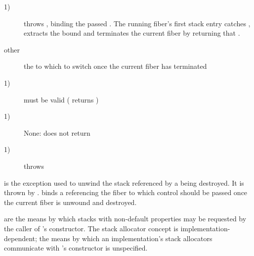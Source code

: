 \begin{description}
    \item[1)] throws \unwindex, binding the passed \fiber. The running fiber's
              first stack entry catches \unwindex, extracts the bound \fiber
              and terminates the current fiber by returning that \fiber.
\end{description}

\begin{description}
    \item[other] the \fiber to which to switch once the current fiber has terminated
\end{description}

\begin{description}
    \item[1)]  must be valid ( returns )
\end{description}

\begin{description}
    \item[1)] None: \unwindfib does not return
\end{description}

\begin{description}
    \item[1)] throws \unwindex
\end{description}



is the exception used to unwind the stack referenced by a \fiber being destroyed.
It is thrown by \unwindfib. \unwindex binds a \fiber referencing the fiber to
which control should be passed once the current fiber is unwound and destroyed.


\label{stackalloc}

are the means by which stacks with non-default properties may be requested by
the caller of \fiber's constructor. The stack allocator concept is
implementation-dependent; the means by which an implementation's
stack allocators communicate with \fiber's constructor is unspecified.\\

